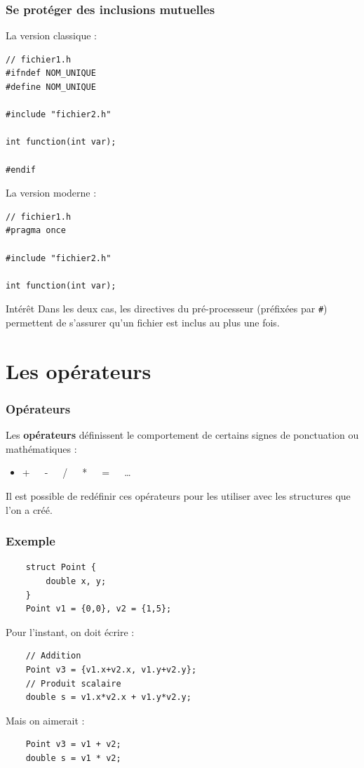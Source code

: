 \begin{frame}[fragile=singleslide]
    \frametitle{Se protéger des inclusions mutuelles}
    
\begin{minipage}{0.48\linewidth}
    La version classique :
    \begin{verbatim}
// fichier1.h
#ifndef NOM_UNIQUE
#define NOM_UNIQUE

#include "fichier2.h"

int function(int var);

#endif
    \end{verbatim}
\end{minipage}
\hfill
\begin{minipage}{0.48\linewidth}
    La version moderne :
    \begin{verbatim}
// fichier1.h
#pragma once

#include "fichier2.h"

int function(int var);
    \end{verbatim}
\vspace{3em}
\end{minipage}

\begin{block}{Intérêt}
Dans les deux cas, les directives du pré-processeur (préfixées par \texttt{\#}) permettent de s'assurer qu'un fichier est inclus au plus une fois.
\end{block}

\end{frame}

\section{Les opérateurs}

\begin{frame}
\frametitle{Opérateurs}
Les \textbf{opérateurs} définissent le comportement de certains signes de ponctuation ou mathématiques : 
\begin{itemize}
\item +~~~-~~~/~~~*~~~=~~~\dots
\end{itemize}

Il est possible de redéfinir ces opérateurs pour les utiliser avec les structures que l'on a créé.
\end{frame}

\begin{frame}[fragile=singleslide]
\frametitle{Exemple}
    \begin{verbatim}
    struct Point {
        double x, y;
    }
    Point v1 = {0,0}, v2 = {1,5};
    \end{verbatim}
    Pour l'instant, on doit écrire :
    \begin{verbatim}    
    // Addition
    Point v3 = {v1.x+v2.x, v1.y+v2.y};
    // Produit scalaire
    double s = v1.x*v2.x + v1.y*v2.y;
    \end{verbatim}
    Mais on aimerait :
    \begin{verbatim}    
    Point v3 = v1 + v2;
    double s = v1 * v2;
    \end{verbatim}
\end{frame}


